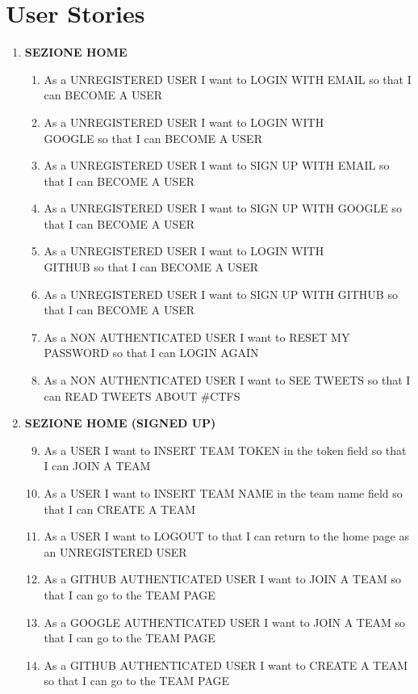 \documentclass[a4paper,12pt]{extarticle}
\begin{document}
\section{User Stories}
\begin{enumerate}[label=\Alph*)]
	\item \textbf{SEZIONE HOME}
	\begin{enumerate}[label=\textbf{\arabic*.}]
		\item As a UNREGISTERED USER I want to LOGIN WITH EMAIL so that I can BECOME A USER
		\item As a UNREGISTERED USER I want to LOGIN WITH\\GOOGLE so that I can BECOME A USER
		\item As a UNREGISTERED USER I want to SIGN UP WITH EMAIL so that I can BECOME A USER
		\item As a UNREGISTERED USER I want to SIGN UP WITH GOOGLE so that I can BECOME A USER
		\item As a UNREGISTERED USER I want to LOGIN WITH\\GITHUB so that I can BECOME A USER
		\item As a UNREGISTERED USER I want to SIGN UP WITH GITHUB so that I can BECOME A USER
        \item As a NON AUTHENTICATED USER I want to RESET MY PASSWORD so that I can LOGIN AGAIN
        \item As a NON AUTHENTICATED USER I want to SEE TWEETS so that I can READ TWEETS ABOUT \#CTFS
	\end{enumerate}
		\item \textbf{SEZIONE HOME (SIGNED UP)}
		\begin{enumerate}[label=\textbf{\arabic*.}]
			\setcounter{enumii}{8}
			\item As a USER I want to INSERT TEAM TOKEN in the token field so that I can JOIN A TEAM
			\item As a USER I want to INSERT TEAM NAME in the team name field so that I can CREATE A TEAM
            \item As a USER I want to LOGOUT to that I can return to the home page as an UNREGISTERED USER
            \item As a GITHUB AUTHENTICATED USER I want to JOIN A TEAM so that I can go to the TEAM PAGE
            \item As a GOOGLE AUTHENTICATED USER I want to JOIN A TEAM so that I can go to the TEAM PAGE
            \item As a GITHUB AUTHENTICATED USER I want to CREATE A TEAM so that I can go to the TEAM PAGE

\end{enumerate}
\end{enumerate}
\end{document}
